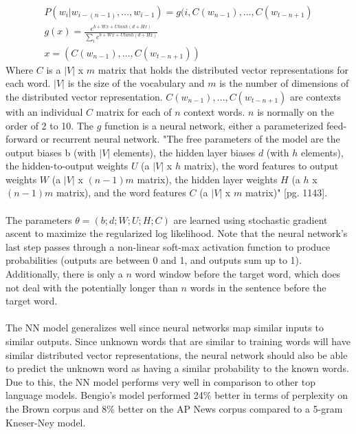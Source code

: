 \documentclass[12pt]{ociamthesis}
\begin{document}
\begin{align}
P(w_i | w_{i-(n-1)},\dots, w_{i-1}) = g( i, C(w_{n-1}), \dots, C(w_{t-n+1})
\\g(x) = \frac {e^{b+Wx+Utanh(d+Hx)}} {\sum_i e^{b+Wx+Utanh(d+Hx)}}
\\x=(C(w_{n-1}), \dots, C(w_{t-n+1}))
\end{align}
Where $C$ is a $|V|$ x $m$ matrix that holds the distributed vector representations for each word.  $|V|$ is the size of the vocabulary and $m$ is the number of dimensions of the distributed vector representation. $C(w_{n-1}), \dots, C(w_{t-n+1})$ are contexts with an individual $C$ matrix for each of $n$ context words. $n$ is normally on the order of 2 to 10. The $g$ function is a neural network, either a parameterized feed-forward or recurrent neural network. 
"The free parameters of the model are the output biases b (with $|V|$ elements), the hidden layer biases $d$ (with $h$ elements), the hidden-to-output weights $U$ (a $|V|$ x $h$ matrix), the word features to output weights $W$ (a $|V|$ x $(n-1)m$ matrix), the hidden layer weights $H$ (a $h$ x $(n-1)m$ matrix), and the word features $C$ (a $|V|$ x $m$ matrix)" \cite{Bengio2003}[pg. 1143].
\paragraph{}
The parameters $\theta = (b;d;W;U;H;C)$ are learned using stochastic gradient ascent to maximize the regularized log likelihood. Note that the neural network's last step passes through a non-linear soft-max activation function to produce probabilities (outputs are between 0 and 1, and outputs sum up to 1). Additionally, there is only a $n$ word window before the target word, which does not deal with the potentially longer than $n$ words in the sentence before the target word.
\paragraph{}
The NN model generalizes well since neural networks map similar inputs to similar outputs. Since unknown words that are similar to training words will have similar distributed vector representations, the neural network should also be able to predict the unknown word as having a similar probability to the known words.  Due to this, the NN model performs very well in comparison to other top language models. Bengio's model performed 24\% better in terms of perplexity on the Brown corpus and 8\% better on the AP News corpus compared to a 5-gram Kneser-Ney model.
\end{document}
